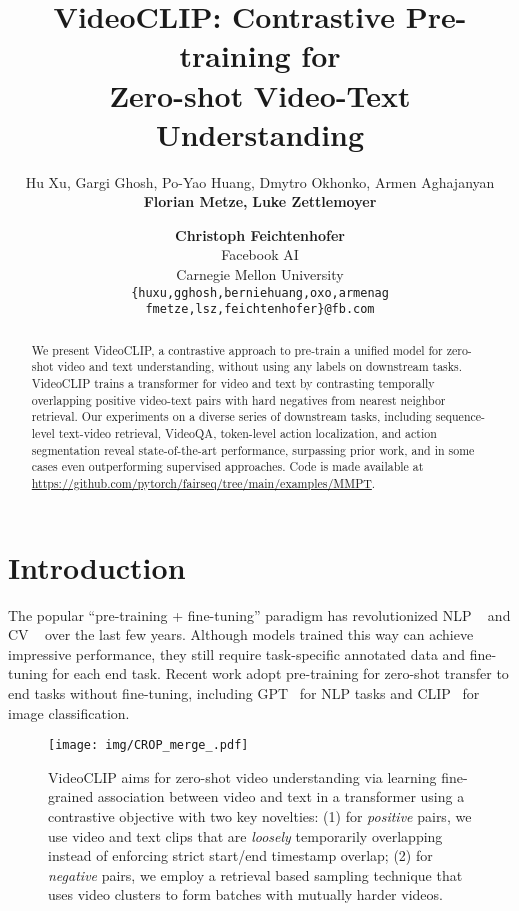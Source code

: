 \documentclass[11pt]{article}
\title{VideoCLIP: Contrastive Pre-training for\\Zero-shot Video-Text Understanding}
\date{}
\author{Hu Xu, Gargi Ghosh, Po-Yao Huang, Dmytro Okhonko, Armen Aghajanyan\\ 
\textbf{Florian Metze,} \textbf{Luke Zettlemoyer} \and \textbf{Christoph Feichtenhofer}\\
Facebook AI\\
Carnegie Mellon University\\
\texttt{\{huxu,gghosh,berniehuang,oxo,armenag}\\
\texttt{fmetze,lsz,feichtenhofer\}@fb.com}
}
\begin{document}
\maketitle
\begin{abstract}
\vspace{-10pt}


We present VideoCLIP, a contrastive approach to pre-train a unified model for zero-shot video and text understanding, without using any labels on downstream tasks. \mbox{VideoCLIP} trains a transformer for video and text by contrasting temporally overlapping positive video-text pairs with hard negatives from nearest neighbor retrieval. Our experiments on a diverse series of  downstream  tasks, including sequence-level text-video retrieval, VideoQA, token-level action localization, and action segmentation reveal state-of-the-art performance, surpassing prior work, and in some cases even outperforming supervised approaches. Code is made available at \url{https://github.com/pytorch/fairseq/tree/main/examples/MMPT}. 
\end{abstract}

\section{Introduction}
\label{sec:intro}

The popular ``pre-training + fine-tuning'' paradigm has revolutionized NLP ~\cite{devlin-etal-2019-bert,liu2019roberta,yang2019xlnet,lewis-etal-2020-bart} and CV ~\cite{chen2020simple,he2020momentum} over the last few years.
Although models trained this way can achieve impressive performance, they still require task-specific annotated data and fine-tuning for each end task. 
Recent work adopt pre-training for zero-shot transfer to end tasks without fine-tuning, including GPT~\cite{radford2018improving,radford2019language,brown2020language} for NLP tasks and CLIP~\cite{radford2021learning} for image classification.



\begin{figure}[!t]
\centering
\vspace{-10pt}
\texttt{[image: img/CROP\_merge\_.pdf]}
\vspace{-15pt}

    \caption{VideoCLIP aims for zero-shot video understanding via learning fine-grained association between video and text in a transformer using a contrastive objective with two key novelties: (1) for \textit{positive} pairs, we use video and text clips that are \textit{loosely} temporarily overlapping instead of enforcing strict start/end timestamp overlap; (2) for \textit{negative} pairs, we employ a retrieval based sampling technique that uses video clusters to form batches with mutually harder videos.} \vspace{-15pt}
\label{fig:overview}
\end{figure}
\end{document}
